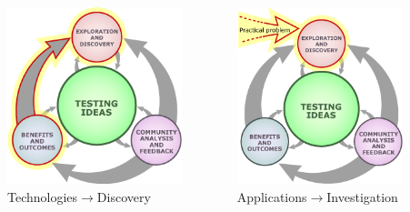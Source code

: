 \documentclass[t]{beamer}
\begin{document}
\begin{ftst}
\begin{columns}[T]
\begin{block}{}
	\end{block}
\begin{block}{}
		\centering\includegraphics[width=0.83\textwidth]{../figs/benefitschart2.png}\\
		\scriptsize Technologies$\rightarrow$Discovery
	\end{block}
\begin{block}{}
		\centering\includegraphics[width=0.79\textwidth]{../figs/benefitschart3.png}\\
		\scriptsize Applications$\rightarrow$Investigation
	\end{block}
\end{columns}
\end{ftst}
\end{document}
